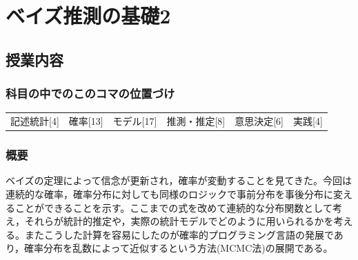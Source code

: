 \section{ベイズ推測の基礎2}
\label{D1_lesson26}

\subsection{授業内容}
\subsubsection{科目の中でのこのコマの位置づけ}
\begin{tabular}[t]{cccccc}
    記述統計[4] & 確率[13] & モデル[17] & 推測・推定[8] & 意思決定[6] & 実践[4]
\end{tabular}

\subsubsection{概要}
ベイズの定理によって信念が更新され，確率が変動することを見てきた。今回は連続的な確率，確率分布に対しても同様のロジックで事前分布を事後分布に変えることができることを示す。ここまでの式を改めて連続的な分布関数として考え，それらが統計的推定や，実際の統計モデルでどのように用いられるかを考える。またこうした計算を容易にしたのが確率的プログラミング言語の発展であり，確率分布を乱数によって近似するという方法(MCMC法)の展開である。

